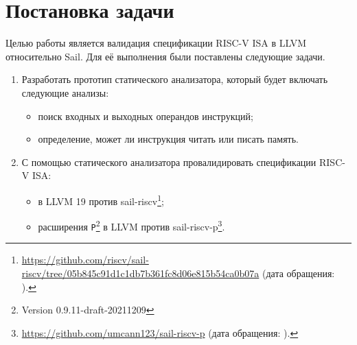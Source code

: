 
\section{Постановка задачи}
\label{sec:task}

Целью работы является валидация спецификации RISC-V ISA в LLVM относительно Sail.
Для её выполнения были поставлены следующие задачи.
\begin{enumerate}
    \item Разработать прототип статического анализатора, который будет включать следующие анализы:
          \begin{itemize}
              \item поиск входных и выходных операндов инструкций;
              \item определение, может ли инструкция читать или писать память.
          \end{itemize}
    \item С помощью статического анализатора провалидировать спецификации RISC-V ISA:
          \begin{itemize}
              \item в LLVM 19 против sail-riscv\footnote{\url{https://github.com/riscv/sail-riscv/tree/05b845c91d1c1db7b361fc8d06e815b54ca0b07a} (дата обращения: ).};
              \item расширения \texttt{P}\footnote{Version 0.9.11-draft-20211209} в LLVM против sail-riscv-p\footnote{\url{https://github.com/umcann123/sail-riscv-p} (дата обращения: ).}.
          \end{itemize}

\end{enumerate}

